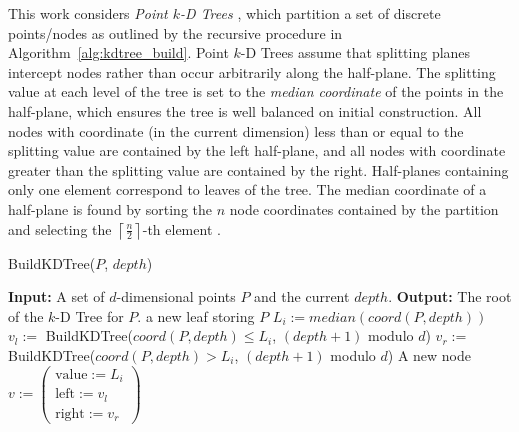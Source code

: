 \documentclass{report}
\begin{document}
This work considers \emph{Point $k$-D Trees} \cite{Samet2005}, which partition a set of discrete points/nodes as outlined by the recursive procedure in Algorithm~\ref{alg:kdtree_build}. Point $k$-D Trees assume that splitting planes intercept nodes rather than occur arbitrarily along the half-plane. The splitting value at each level of the tree is set to the \emph{median coordinate} of the points in the half-plane, which ensures the tree is well balanced on initial construction. All nodes with coordinate (in the current dimension) less than or equal to the splitting value are contained by the left half-plane, and all nodes with coordinate greater than the splitting value are contained by the right. Half-planes containing only one element correspond to leaves of the tree. The median coordinate of a half-plane is found by sorting the $n$ node coordinates contained by the partition and selecting the $\left\lceil \frac{n}{2} \right\rceil$-th element \cite{Berg2008}. 
\begin{algorithm} 
\caption{BuildKDTree($P$, $depth$)}         \label{alg:kdtree_build}  
\begin{algorithmic}[1]    
    \State \textbf{Input:} A set of $d$-dimensional points $P$ and the current $depth$.
    \State \textbf{Output:} The root of the $k$-D Tree for $P$.
    \State
    \State \Return a new leaf storing $P$
    \EndIf
    \State $L_i := median(coord(P, depth))$ 
    \State $v_{l} := $ BuildKDTree($coord(P, depth) \leq L_i$, $(depth+1)$ modulo $d$)
    \State $v_{r} := $ BuildKDTree($coord(P, depth) > L_i$, $(depth+1)$ modulo $d$) 
    \State \Return A new node $v := \begin{pmatrix} \text{value} := L_i \\ \text{left} := v_l \\ \text{right} := v_r \end{pmatrix}$ 
\end{algorithmic}
\end{algorithm}
\end{document}
